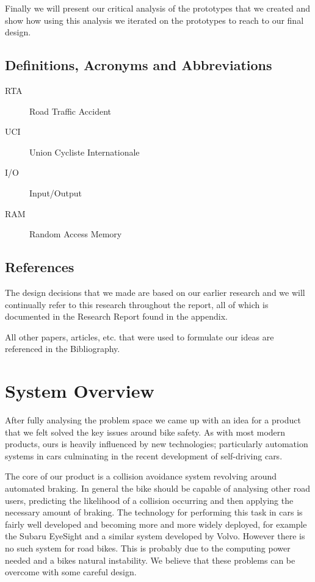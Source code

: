 \documentclass[a4paper]{report}
\begin{document}
Finally we will present our critical analysis of the prototypes that we created and show how using this analysis we iterated on the prototypes to reach to our final design.

\section{Definitions, Acronyms and Abbreviations}
\begin{description}
\item[RTA] Road Traffic Accident
\item[UCI] Union Cycliste Internationale
\item[I/O] Input/Output
\item[RAM] Random Access Memory
\end{description}
\section{References}
The design decisions that we made are based on our earlier research and we will continually refer to this research throughout the report, all of which is documented in the Research Report found in the appendix. 

All other papers, articles, etc. that were used to formulate our ideas are referenced in the Bibliography.

\chapter{System Overview}
After fully analysing the problem space we came up with an idea for a product that we felt solved the key issues around bike safety. As with most modern products, ours is heavily influenced by new technologies; particularly automation systems in cars culminating in the recent development of self-driving cars. %

The core of our product is a collision avoidance system revolving around automated braking. In general the bike should be capable of analysing other road users, predicting the likelihood of a collision occurring and then applying the necessary amount of braking. The technology for performing this task in cars is fairly well developed and becoming more and more widely deployed, for example the Subaru EyeSight\cite{eyesight} and a similar system developed by Volvo\cite{volvo}. However there is no such system for road bikes. This is probably due to the computing power needed and a bikes natural instability. We believe that these problems can be overcome with some careful design.
\end{document}
